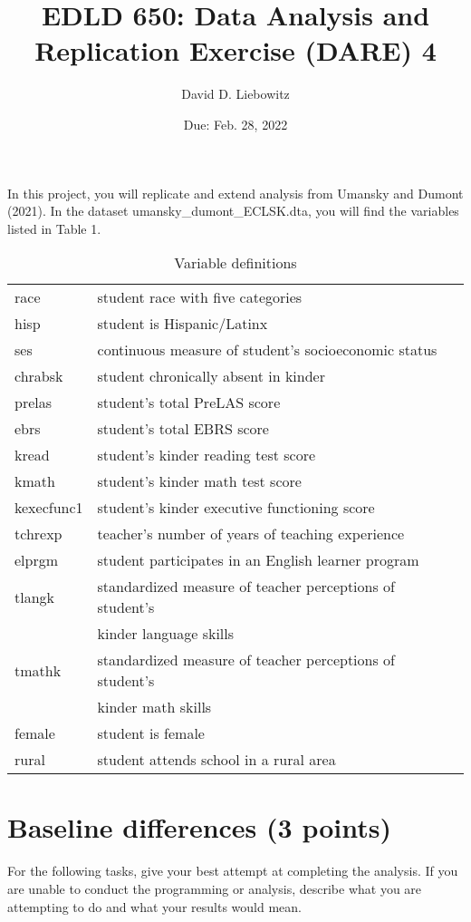 \documentclass[a4paper, 11pt]{article}
\title{EDLD 650: Data Analysis and Replication Exercise (DARE) 4}
\author{David D. Liebowitz}
\date{Due: Feb. 28, 2022}
\begin{document}
\maketitle

In this project, you will replicate and extend analysis from Umansky and Dumont (2021). In the dataset umansky\_dumont\_ECLSK.dta, you will find the variables listed in Table 1. 

\begin{table}[!htbp] \centering 
  \caption{Variable definitions} 

  \label{} 
\begin{tabular}{ll} 
\hline
\hline
race  &    student race with five categories \\
hisp & student is Hispanic/Latinx \\
ses      &    continuous measure of student's socioeconomic status \\
chrabsk &     student chronically absent in kinder \\
prelas      &   student's total PreLAS score \\
ebrs          & student's total EBRS score \\
kread         &   student's kinder reading test score \\
kmath           &  student's kinder math test score \\
kexecfunc1     &   student's kinder executive functioning score \\
tchrexp         & teacher's number of years of teaching experience \\
elprgm      & student participates in an English learner program \\
tlangk        &     standardized measure of teacher perceptions of student's \\
&				 kinder language skills \\
tmathk        &  standardized measure of teacher perceptions of student's \\
&				kinder math skills \\
female       &student is female \\
rural          & student attends school in a rural area \\

\hline
\hline

\end{tabular}
\end{table}

\section{Baseline differences  (3 points)}
For the following tasks, give your best attempt at completing the analysis. If you are unable to conduct the programming or analysis, describe what you are attempting to do and what your results would mean.
\end{document}
